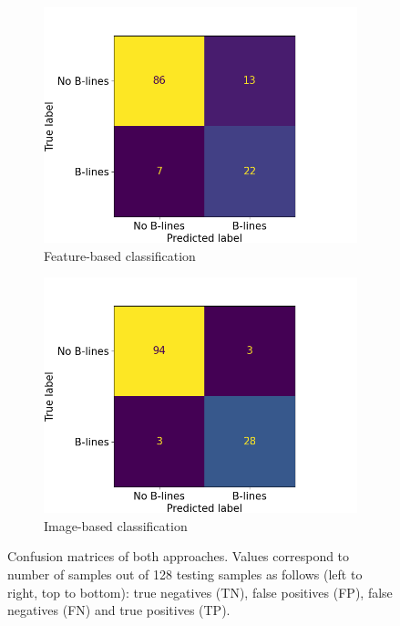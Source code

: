 \documentclass[12pt]{article} %
\begin{document}
	
\begin{figure}
\centering
\begin{subfigure}{0.45\textwidth}
\includegraphics[width=\textwidth]{figuras/feature_confusion.png}
\caption{Feature-based classification}
\end{subfigure}
\begin{subfigure}{0.45\textwidth}
\includegraphics[width=\textwidth]{figuras/image_confusion.png}
\caption{Image-based classification}
\end{subfigure}
\caption{\small Confusion matrices of both approaches. Values correspond to number of samples out of 128 testing samples as follows (left to right, top to bottom): true negatives (TN), false positives (FP), false negatives (FN) and true positives (TP).}
\label{confusion}
\end{figure}	
	
\end{document}
